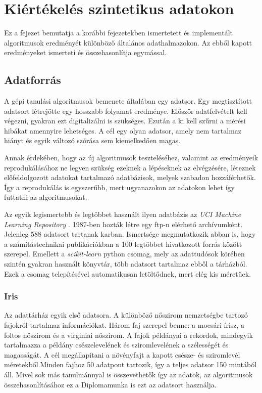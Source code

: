 \chapter{Kiértékelés szintetikus adatokon}\label{chapter:kiertekelesszintetikus}

Ez a fejezet bemutatja a korábbi fejezetekben ismertetett és implementált algoritmusok eredményét különböző általános adathalmazokon. Az ebből kapott eredményeket ismerteti és összehasonlítja egymással.

\section{Adatforrás}
A gépi tanulási algoritmusok bemenete általában egy adatsor. Egy megtisztított adatsort létrejötte egy hosszabb folyamat eredménye. Először adatfelvételt kell végezni, gyakran ezt digitalizálni is szükséges. Ezután a ki kell szűrni a mérési hibákat amennyire lehetséges. A cél egy olyan adatsor, amely nem tartalmaz hiányt és egyik változó szórása sem kiemelkedően magas.

Annak érdekében, hogy az új algoritmusok teszteléséhez, valamint az eredményeik reprodukálásához ne legyen szükség ezeknek a lépéseknek az elvégzésére, léteznek előfeldolgozott adatokat tartalmazó adatbázisok, melyek szabadon hozzáférhetők. Így a reprodukálás is egyszerűbb, mert ugyanazokon az adatokon lehet így futtatni az algoritmusokat.

Az egyik legismertebb és legtöbbet használt ilyen adatbázis az \emph{UCI Machine Learning Repository} \cite{dua2019university}. 1987-ben hozták létre egy ftp-n elérhető archívumként. Jelenleg 588 adatsort tartanak karban. Ismertsége megmutatkozik abban is, hogy a számítástechnikai publikációkban a 100 legtöbbet hivatkozott forrás között szerepel. Emellett a \emph{scikit-learn} python csomag, mely az adattudósok körében szintén gyakran használt könyvtár, több adatsort tartalmaz ebből a tárházból. Ezek a csomag telepítésével automatikusan letöltődnek, mert elég kis méretűek.

\subsection{Iris}
Az adattárház egyik első adatsora. A különböző nőszirom nemzetségbe tartozó fajokról tartalmaz információkat. Három faj szerepel benne: a mocsári írisz, a foltos nőszirom és a virginiai nőszirom. A fajok példányai a rekordok, mindegyik tartalmazza a példány csészelevelének és sziromlevelének a szélességét és magasságát. A cél megállapítani a növényfajt a kapott csésze- és sziromlevél méretekből.Minden fajhoz 50 adatpont tartozik, így a teljes adatsor 150 mintából áll. Mivel sok más tanulmánnyal is összevethetők így az adatok, az algoritmusok összehasonlításához ez a Diplomamunka is ezt az adatsort használja.

